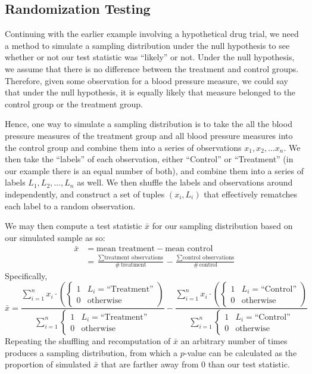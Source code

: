 \documentclass[10pt]{article}
\newcommand{\spacer}[0]{\par\vspace{0.1in}}
\begin{document}
\subsection{Randomization Testing}
Continuing with the earlier example involving a hypothetical drug trial, we need a method to simulate a sampling distribution under the null hypothesis to see whether or not our test statistic was ``likely'' or not. Under the null hypothesis, we assume that there is no difference between the treatment and control groups. Therefore, given some observation for a blood pressure measure, we could say that under the null hypothesis, it is equally likely that measure belonged to the control group or the treatment group.
\spacer
Hence, one way to simulate a sampling distribution is to take the all the blood pressure measures of the treatment group and all blood pressure measures into the control group and combine them into a series of observations $x_1,x_2,\dots x_n$. We then take the ``labels'' of each observation, either ``Control'' or ``Treatment'' (in our example there is an equal number of both), and combine them into a series of labels $L_1,L_2,\dots,L_n$ as well. We then shuffle the labels and observations around independently, and construct a set of tuples $(x_i,L_i)$ that effectively rematches each label to a random observation.
\spacer
We may then compute a test statistic $\bar x$ for our sampling distribution based on our simulated sample as so:
$$
    \begin{aligned}
    \bar x &= \text{mean treatment} - \text{mean control} \\
    &= \frac{\sum \text{treatment observations}}{\#\,\text{treatment}} - \frac{\sum \text{control observations}}{\#\,\text{control}}
    \end{aligned}
$$
Specifically,
$$
    \bar x =  \frac{\displaystyle \sum_{i=1}^n x_i\cdot\left(\begin{cases}1&L_i=\text{``Treatment''} \\ 0&\text{otherwise}\end{cases}\right)}{\displaystyle \sum_{i=1}^n\begin{cases}1&L_i=\text{``Treatment''} \\ 0&\text{otherwise}\end{cases}} -   \frac{\displaystyle \sum_{i=1}^n x_i\cdot\left(\begin{cases}1&L_i=\text{``Control''} \\ 0&\text{otherwise}\end{cases}\right)}{\displaystyle \sum_{i=1}^n\begin{cases}1&L_i=\text{``Control''} \\ 0&\text{otherwise}\end{cases}}
$$
Repeating the shuffling and recomputation of $\bar x$ an arbitrary number of times produces a sampling distribution, from which a $p$-value can be calculated as the proportion of simulated $\bar x$ that are farther away from 0 than our test statistic.
\end{document}
